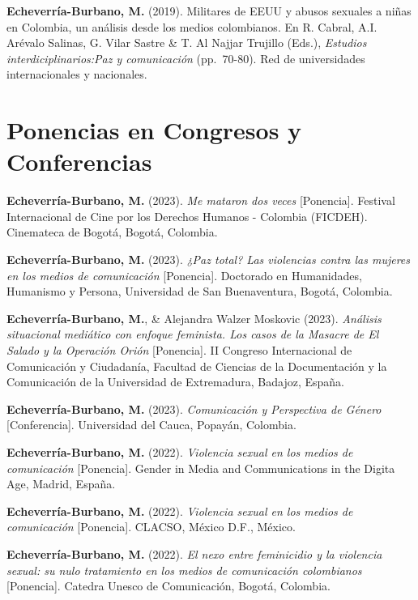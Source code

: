 \documentclass[11pt,a4paper,]{awesome-cv}
\begin{document}
\textbf{Echeverría-Burbano, M.} (2019). Militares de EEUU y abusos
sexuales a niñas en Colombia, un análisis desde los medios colombianos.
En R. Cabral, A.I. Arévalo Salinas, G. Vilar Sastre \& T. Al Najjar
Trujillo (Eds.), \emph{Estudios interdiciplinarios:Paz y comunicación}
(pp.~70-80). Red de universidades internacionales y nacionales.

\endgroup

\hypertarget{ponencias-en-congresos-y-conferencias}{%
\section{Ponencias en Congresos y
Conferencias}\label{ponencias-en-congresos-y-conferencias}}

\begingroup
\setlength{\parindent}{-0.5in}
\setlength{\leftskip}{0.5in}

\textbf{Echeverría-Burbano, M.} (2023). \emph{Me mataron dos veces}
{[}Ponencia{]}. Festival Internacional de Cine por los Derechos Humanos
- Colombia (FICDEH). Cinemateca de Bogotá, Bogotá, Colombia.

\textbf{Echeverría-Burbano, M.} (2023). \emph{¿Paz total? Las violencias
contra las mujeres en los medios de comunicación} {[}Ponencia{]}.
Doctorado en Humanidades, Humanismo y Persona, Universidad de San
Buenaventura, Bogotá, Colombia.

\textbf{Echeverría-Burbano, M.}, \& Alejandra Walzer Moskovic (2023).
\emph{Análisis situacional mediático con enfoque feminista. Los casos de
la Masacre de El Salado y la Operación Orión} {[}Ponencia{]}. II
Congreso Internacional de Comunicación y Ciudadanía, Facultad de
Ciencias de la Documentación y la Comunicación de la Universidad de
Extremadura, Badajoz, España.

\textbf{Echeverría-Burbano, M.} (2023). \emph{Comunicación y Perspectiva
de Género} {[}Conferencia{]}. Universidad del Cauca, Popayán, Colombia.

\textbf{Echeverría-Burbano, M.} (2022). \emph{Violencia sexual en los
medios de comunicación} {[}Ponencia{]}. Gender in Media and
Communications in the Digita Age, Madrid, España.

\textbf{Echeverría-Burbano, M.} (2022). \emph{Violencia sexual en los
medios de comunicación} {[}Ponencia{]}. CLACSO, México D.F., México.

\textbf{Echeverría-Burbano, M.} (2022). \emph{El nexo entre feminicidio
y la violencia sexual: su nulo tratamiento en los medios de comunicación
colombianos} {[}Ponencia{]}. Catedra Unesco de Comunicación, Bogotá,
Colombia.
\end{document}
